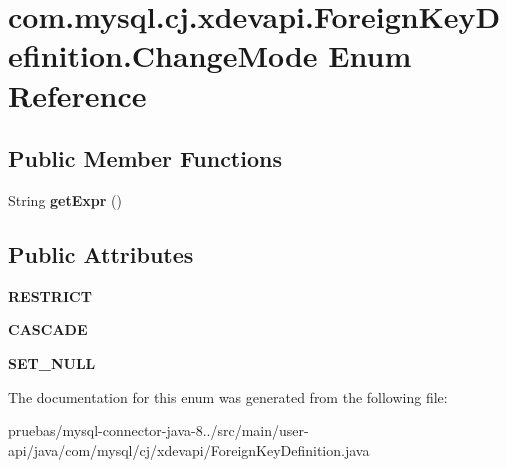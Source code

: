 \hypertarget{enumcom_1_1mysql_1_1cj_1_1xdevapi_1_1_foreign_key_definition_1_1_change_mode}{}\section{com.\+mysql.\+cj.\+xdevapi.\+Foreign\+Key\+Definition.\+Change\+Mode Enum Reference}
\label{enumcom_1_1mysql_1_1cj_1_1xdevapi_1_1_foreign_key_definition_1_1_change_mode}
\subsection*{Public Member Functions}
\begin{DoxyCompactItemize}
\item 
\mbox{\label{enumcom_1_1mysql_1_1cj_1_1xdevapi_1_1_foreign_key_definition_1_1_change_mode_aad5b7590ed25eab2bcd98ad32f479ceb}} 
String {\bfseries get\+Expr} ()
\end{DoxyCompactItemize}
\subsection*{Public Attributes}
\begin{DoxyCompactItemize}
\item 
\mbox{\label{enumcom_1_1mysql_1_1cj_1_1xdevapi_1_1_foreign_key_definition_1_1_change_mode_a652113557f37d85e0f6ad8c4c83bf864}} 
{\bfseries R\+E\+S\+T\+R\+I\+CT}
\item 
\mbox{\label{enumcom_1_1mysql_1_1cj_1_1xdevapi_1_1_foreign_key_definition_1_1_change_mode_ada7c6b07006f752748719b8276a3c88c}} 
{\bfseries C\+A\+S\+C\+A\+DE}
\item 
\mbox{\label{enumcom_1_1mysql_1_1cj_1_1xdevapi_1_1_foreign_key_definition_1_1_change_mode_a29451c017ce42e821426b05406d3eed3}} 
{\bfseries S\+E\+T\+\_\+\+N\+U\+LL}
\end{DoxyCompactItemize}


The documentation for this enum was generated from the following file\+:\begin{DoxyCompactItemize}
\item 
pruebas/mysql-\/connector-\/java-\/8../src/main/user-\/api/java/com/mysql/cj/xdevapi/Foreign\+Key\+Definition.\+java\end{DoxyCompactItemize}
